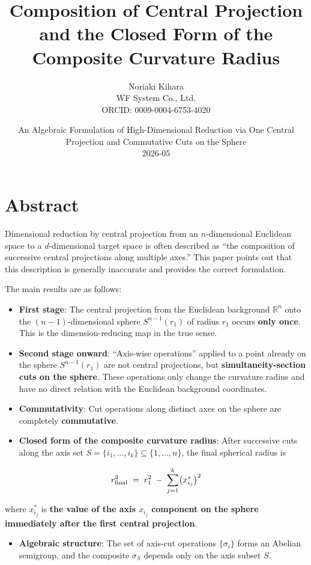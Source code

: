 \documentclass[a4paper,11pt]{article}
\title{Composition of Central Projection and the Closed Form of the
Composite Curvature Radius}
\date{An Algebraic Formulation of High-Dimensional Reduction via One
Central Projection and Commutative Cuts on the Sphere \\[1ex] 2026-05}
\author{Noriaki Kihara \\ \small WF System Co.,
Ltd. \\ \small ORCID: 0009-0004-6753-4020}
\theoremstyle{definition}
\theoremstyle{remark}
\providecommand{\tightlist}{%
  \setlength{\itemsep}{0pt}\setlength{\parskip}{0pt}}
\begin{document}
\maketitle

\section{Abstract}\label{abstract}

Dimensional reduction by central projection from an \(n\)-dimensional
Euclidean space to a \(d\)-dimensional target space is often described
as ``the composition of successive central projections along multiple
axes.'' This paper points out that this description is generally
inaccurate and provides the correct formulation.

The main results are as follows:

\begin{itemize}
\tightlist
\item
  \textbf{First stage}: The central projection from the Euclidean
  background \(\mathbb{R}^n\) onto the \((n-1)\)-dimensional sphere
  \(S^{n-1}(r_1)\) of radius \(r_1\) occurs \textbf{only once}. This is
  the dimension-reducing map in the true sense.
\item
  \textbf{Second stage onward}: ``Axis-wise operations'' applied to a
  point already on the sphere \(S^{n-1}(r_1)\) are not central
  projections, but \textbf{simultaneity-section cuts on the sphere}.
  These operations only change the curvature radius and have no direct
  relation with the Euclidean background coordinates.
\item
  \textbf{Commutativity}: Cut operations along distinct axes on the
  sphere are completely \textbf{commutative}.
\item
  \textbf{Closed form of the composite curvature radius}: After
  successive cuts along the axis set
  \(S = \{i_1, \ldots, i_k\} \subseteq \{1, \ldots, n\}\), the final
  spherical radius is
\end{itemize}

\[
r_{\rm final}^{2} \;=\; r_{1}^{2} \;-\; \sum_{j=1}^{k}\bigl(x_{i_j}^{*}\bigr)^{2}
\]

where \(x_{i_j}^{*}\) is \textbf{the value of the axis \(x_{i_j}\)
component on the sphere immediately after the first central projection}.

\begin{itemize}
\tightlist
\item
  \textbf{Algebraic structure}: The set of axis-cut operations
  \(\{\sigma_i\}\) forms an Abelian semigroup, and the composite
  \(\sigma_S\) depends only on the axis subset \(S\).
\end{itemize}
\end{document}
